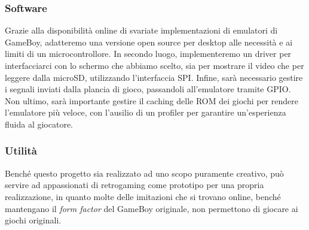 \documentclass[12pt]{article}
\begin{document}
\subsubsection{Software}
Grazie alla disponibilità online di svariate implementazioni di emulatori di
GameBoy, adatteremo una versione open source per desktop alle necessità e ai
limiti di un microcontrollore. In secondo luogo, implementeremo un driver per
interfacciarci con lo schermo che abbiamo scelto, sia per mostrare il video che
per leggere dalla microSD, utilizzando l'interfaccia SPI. Infine, sarà
necessario gestire i segnali inviati dalla plancia di gioco, passandoli
all'emulatore tramite GPIO. Non ultimo, sarà importante gestire il caching delle
ROM dei giochi per rendere l'emulatore più veloce, con l'ausilio di un profiler
per garantire un'esperienza fluida al giocatore.

\subsubsection{Utilità}
Benché questo progetto sia realizzato ad uno scopo puramente creativo, può
servire ad appassionati di retrogaming come prototipo per una propria
realizzazione, in quanto molte delle imitazioni che si trovano online, benché
mantengano il \textit{form factor} del GameBoy originale, non permettono di
giocare ai giochi originali. 
\end{document}
